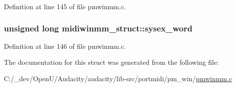 Definition at line 145 of file pmwinmm.\+c.

\subsubsection[{\texorpdfstring{sysex\+\_\+word}{sysex_word}}]{\setlength{\rightskip}{0pt plus 5cm}unsigned long midiwinmm\+\_\+struct\+::sysex\+\_\+word}\hypertarget{structmidiwinmm__struct_abafd2354939bfc342b3e627b26f974df}{}\label{structmidiwinmm__struct_abafd2354939bfc342b3e627b26f974df}


Definition at line 146 of file pmwinmm.\+c.



The documentation for this struct was generated from the following file\+:\begin{DoxyCompactItemize}
\item 
C\+:/\+\_\+dev/\+Open\+U/\+Audacity/audacity/lib-\/src/portmidi/pm\+\_\+win/\hyperlink{pmwinmm_8c}{pmwinmm.\+c}\end{DoxyCompactItemize}
